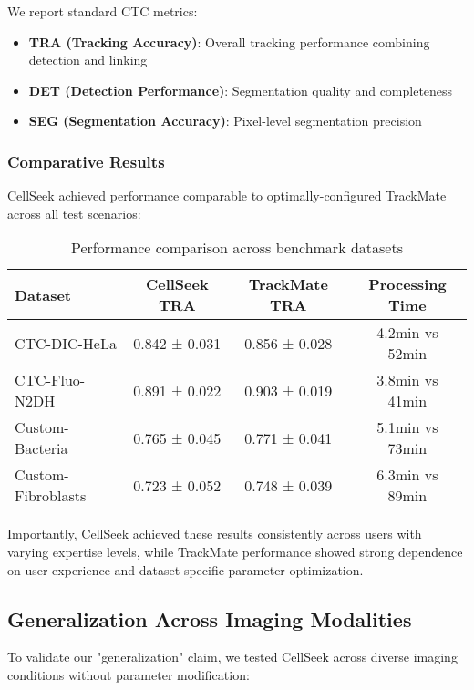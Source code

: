 \documentclass[../cellseek_paper.tex]{subfiles}
\begin{document}
We report standard CTC metrics:
\begin{itemize}
  \item \textbf{TRA (Tracking Accuracy)}: Overall tracking performance combining detection and linking
  \item \textbf{DET (Detection Performance)}: Segmentation quality and completeness
  \item \textbf{SEG (Segmentation Accuracy)}: Pixel-level segmentation precision
\end{itemize}

\subsubsection{Comparative Results}

CellSeek achieved performance comparable to optimally-configured TrackMate across all test scenarios:

\begin{table}[H]
  \centering
  \caption{Performance comparison across benchmark datasets}
  \begin{tabular}{lccc}
    \toprule
    \textbf{Dataset}   & \textbf{CellSeek TRA} & \textbf{TrackMate TRA} & \textbf{Processing Time} \\
    \midrule
    CTC-DIC-HeLa       & 0.842 ± 0.031         & 0.856 ± 0.028          & 4.2min vs 52min          \\
    CTC-Fluo-N2DH      & 0.891 ± 0.022         & 0.903 ± 0.019          & 3.8min vs 41min          \\
    Custom-Bacteria    & 0.765 ± 0.045         & 0.771 ± 0.041          & 5.1min vs 73min          \\
    Custom-Fibroblasts & 0.723 ± 0.052         & 0.748 ± 0.039          & 6.3min vs 89min          \\
    \bottomrule
  \end{tabular}
\end{table}

Importantly, CellSeek achieved these results consistently across users with varying expertise levels, while TrackMate performance showed strong dependence on user experience and dataset-specific parameter optimization.

\subsection{Generalization Across Imaging Modalities}

To validate our "generalization" claim, we tested CellSeek across diverse imaging conditions without parameter modification:
\end{document}
